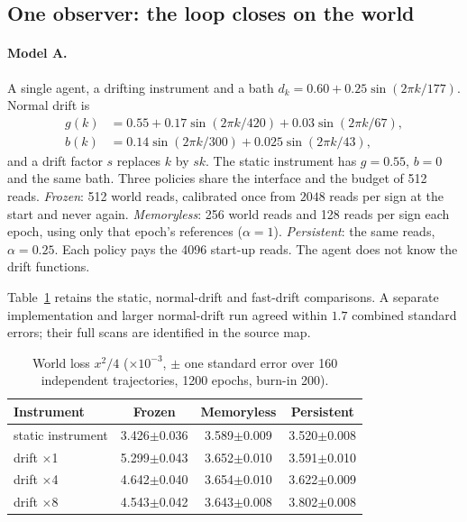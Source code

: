 \documentclass[12pt]{article}
\theoremstyle{definition}
\begin{document}
\subsection{One observer: the loop closes on the world}\label{subsec:model_A}

\paragraph{Model A.} A single agent, a drifting instrument and a bath $d_k=0.60+0.25\sin(2\pi k/177)$. Normal drift is
\begin{align*}
g(k)&=0.55+0.17\sin(2\pi k/420)+0.03\sin(2\pi k/67),\\
b(k)&=0.14\sin(2\pi k/300)+0.025\sin(2\pi k/43),
\end{align*}
and a drift factor $s$ replaces $k$ by $sk$. The static instrument has $g=0.55$, $b=0$ and the same bath. Three policies share the interface and the budget of 512 reads. \emph{Frozen}: 512 world reads, calibrated once from $2048$ reads per sign at the start and never again. \emph{Memoryless}: 256 world reads and 128 reads per sign each epoch, using only that epoch's references ($\alpha=1$). \emph{Persistent}: the same reads, $\alpha=0.25$. Each policy pays the 4096 start-up reads. The agent does not know the drift functions.

Table~\ref{tab:loop} retains the static, normal-drift and fast-drift comparisons. A separate implementation and larger normal-drift run agreed within $1.7$ combined standard errors; their full scans are identified in the source map.

\begin{table}[htbp]
\centering
\begin{tabular}{lccc}
\hline
Instrument & Frozen & Memoryless & Persistent \\
\hline
static instrument & 3.426$\pm$0.036 & 3.589$\pm$0.009 & 3.520$\pm$0.008 \\
drift $\times$1 & 5.299$\pm$0.043 & 3.652$\pm$0.010 & 3.591$\pm$0.010 \\
drift $\times$4 & 4.642$\pm$0.040 & 3.654$\pm$0.010 & 3.622$\pm$0.009 \\
drift $\times$8 & 4.543$\pm$0.042 & 3.643$\pm$0.008 & 3.802$\pm$0.008 \\
\hline
\end{tabular}
\caption{World loss $x^2/4$ ($\times10^{-3}$, $\pm$ one standard error over 160 independent trajectories, 1200 epochs, burn-in 200).}
\label{tab:loop}
\end{table}
\end{document}
